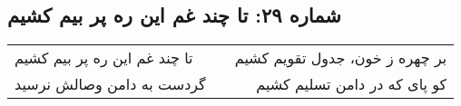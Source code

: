 \begin{center}
\section*{شماره ۲۹: تا چند غم این ره پر بیم کشیم}
\label{sec:029}
\begin{longtable}{l p{0.5cm} r}
تا چند غم این ره پر بیم کشیم
&&
بر چهره ز خون، جدول تقویم کشیم
\\
گردست به دامن وصالش نرسید
&&
کو پای که در دامن تسلیم کشیم
\\
\end{longtable}
\end{center}
